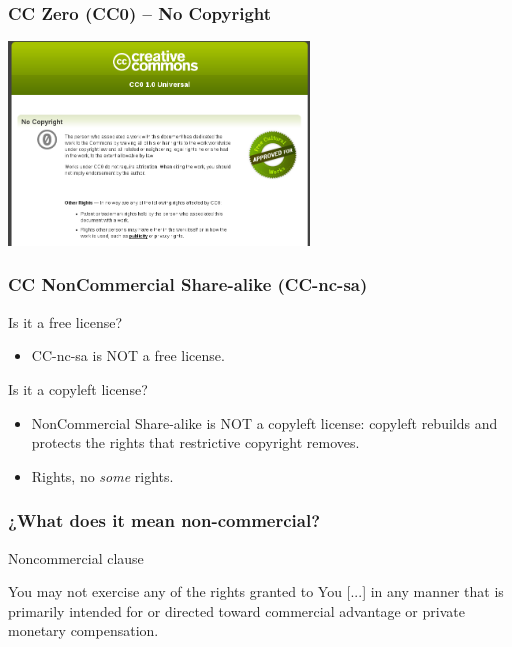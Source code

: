 
\begin{frame}
\frametitle{CC Zero (CC0) -- No Copyright}

\begin{center}
\includegraphics[width=8cm]{figs/cc0.png}
\end{center}


\end{frame}

\begin{frame}
\frametitle{CC NonCommercial Share-alike (CC-nc-sa)}

Is it a free license?
\pause

\begin{itemize}
\item CC-nc-sa is \alert{NOT} a free license.
\end{itemize}                                                 

\pause

Is it a copyleft license?
\pause

\begin{itemize}
\item NonCommercial Share-alike is \alert{NOT} a copyleft license: copyleft rebuilds and protects the rights that restrictive copyright removes.
\item \alert Rights, no \textit{some} rights.
\end{itemize}                                                 

\end{frame}



\begin{frame}
\frametitle{¿What does it mean non-commercial?}

\begin{block}{Noncommercial clause}
\small

You may not exercise any of the rights granted to You [...] in any manner that is primarily intended for or directed toward commercial advantage or private monetary compensation. 



\end{block}

\end{frame}


